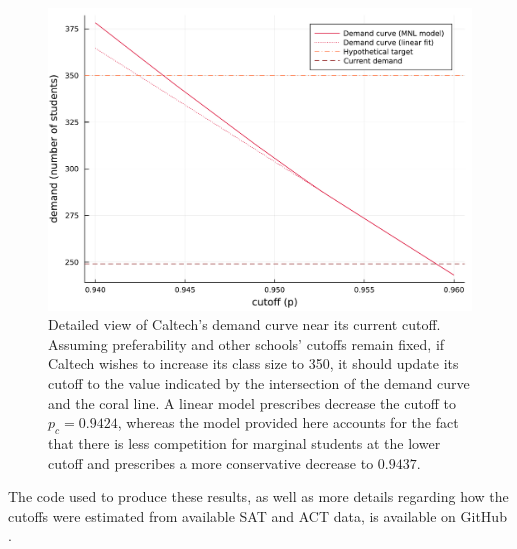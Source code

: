 \documentclass[12pt]{article}
\theoremstyle{definition}
\begin{document}
\begin{figure}
\begin{center}\includegraphics[width=\linewidth, ]{plots/caltech-demand-curve.pdf}\end{center}
\captionsetup{singlelinecheck=off}
    \caption[.]{Detailed view of Caltech's demand curve near its current cutoff. Assuming preferability and other schools' cutoffs remain fixed, if Caltech wishes to increase its class size to 350, it should update its cutoff to the value indicated by the intersection of the demand curve and the coral line. A linear model prescribes decrease the cutoff to $p_c = 0.9424$, whereas the model provided here accounts for the fact that there is less competition for marginal students at the lower cutoff and prescribes a more conservative decrease to $0.9437$. }
\label{caltech-demand-curve}
\end{figure}








The code used to produce these results, as well as more details regarding how the cutoffs were estimated from available SAT and ACT data, is available on GitHub \parencite[][]{studentprefsrevopt}.
\end{document}
